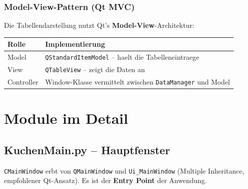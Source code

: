 \documentclass[12pt, a4paper]{article}
\begin{document}
\subsubsection{Model-View-Pattern (Qt MVC)}

Die Tabellendarstellung nutzt Qt's \textbf{Model-View}-Architektur:

\begin{table}[ht!]
\centering
{}
\begin{tabularx}{0.85\textwidth}{lX}
\toprule
\textbf{Rolle} & \textbf{Implementierung} \\
\midrule
Model & \texttt{QStandardItemModel} -- haelt die Tabelleneintraege \\
View & \texttt{QTableView} -- zeigt die Daten an \\
Controller & Window-Klasse vermittelt zwischen \texttt{DataManager} und Model \\
\bottomrule
\end{tabularx}
\end{table}


\section{Module im Detail}

\subsection{KuchenMain.py -- Hauptfenster}

\texttt{CMainWindow} erbt von \texttt{QMainWindow} und \texttt{Ui\_MainWindow}
(Multiple Inheritance, empfohlener Qt-Ansatz). Es ist der \textbf{Entry Point}
der Anwendung.
\end{document}
